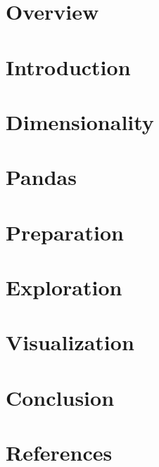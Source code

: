 \section[Overview]{Overview}


\section[DataIntro]{Introduction}


\section[Dim]{Dimensionality}


\section[Pandas]{Pandas}


\section[Prep]{Preparation}


\section[EDA]{Exploration}





\section[Viz]{Visualization}


\section[End]{Conclusion}


\section[Refs]{References}
